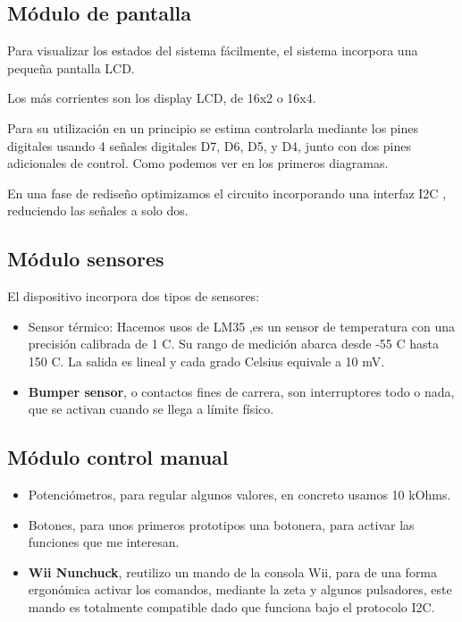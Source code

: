 \subsection{Módulo de pantalla}

Para visualizar los estados del sistema fácilmente, el sistema incorpora una pequeña pantalla LCD. 

Los más corrientes son los display LCD, de 16x2 o 16x4.

Para su utilización en un principio se estima controlarla mediante los pines digitales usando 4 señales digitales D7, D6, D5, y D4, junto con dos pines adicionales de control. Como podemos ver en los primeros diagramas.

En una fase de rediseño optimizamos el circuito incorporando una interfaz I2C \cite{I2C}, reduciendo las señales a solo dos. 


\subsection{Módulo sensores}

El dispositivo incorpora dos tipos de sensores:

\begin{itemize}
	\item Sensor térmico: Hacemos usos de  LM35 \cite{LM35},es un sensor de temperatura con una precisión calibrada de 1 \grad C. Su rango de medición abarca desde -55 \grad C hasta 150 \grad C. La salida es lineal y cada grado Celsius equivale a 10 mV.
	\item \textbf{Bumper sensor}, o contactos fines de carrera, son interruptores todo o nada, que se activan cuando se llega a límite físico. 
\end{itemize}


\subsection{Módulo control manual}

\begin{itemize}
	\item Potenciómetros, para regular algunos valores, en concreto usamos 10 kOhms.
	
	\item Botones, para unos primeros prototipos una botonera, para activar las funciones que me interesan.
	
	\item \textbf{Wii Nunchuck}, reutilizo un mando de la consola Wii, para de una forma ergonómica activar los comandos, mediante la zeta y algunos pulsadores, este mando es totalmente compatible dado que funciona bajo el protocolo I2C.
	 
\end{itemize}

